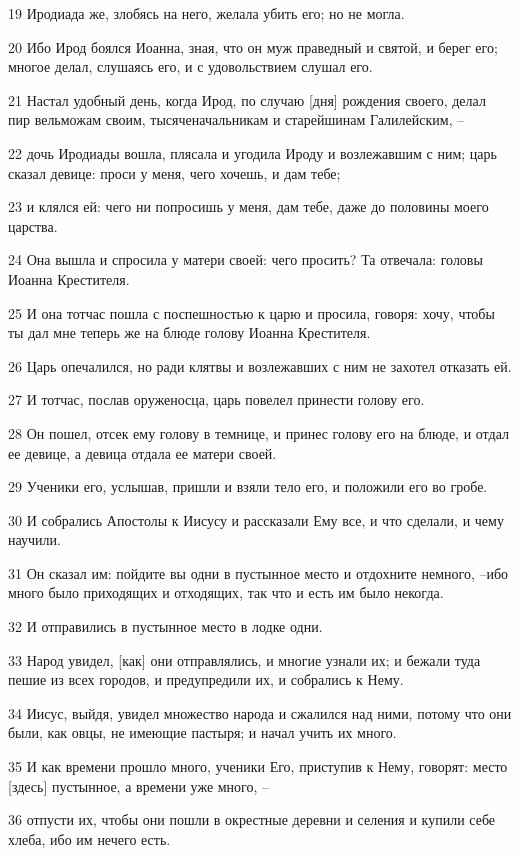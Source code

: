 \par 19 Иродиада же, злобясь на него, желала убить его; но не могла.
\par 20 Ибо Ирод боялся Иоанна, зная, что он муж праведный и святой, и берег его; многое делал, слушаясь его, и с удовольствием слушал его.
\par 21 Настал удобный день, когда Ирод, по случаю [дня] рождения своего, делал пир вельможам своим, тысяченачальникам и старейшинам Галилейским, --
\par 22 дочь Иродиады вошла, плясала и угодила Ироду и возлежавшим с ним; царь сказал девице: проси у меня, чего хочешь, и дам тебе;
\par 23 и клялся ей: чего ни попросишь у меня, дам тебе, даже до половины моего царства.
\par 24 Она вышла и спросила у матери своей: чего просить? Та отвечала: головы Иоанна Крестителя.
\par 25 И она тотчас пошла с поспешностью к царю и просила, говоря: хочу, чтобы ты дал мне теперь же на блюде голову Иоанна Крестителя.
\par 26 Царь опечалился, но ради клятвы и возлежавших с ним не захотел отказать ей.
\par 27 И тотчас, послав оруженосца, царь повелел принести голову его.
\par 28 Он пошел, отсек ему голову в темнице, и принес голову его на блюде, и отдал ее девице, а девица отдала ее матери своей.
\par 29 Ученики его, услышав, пришли и взяли тело его, и положили его во гробе.
\par 30 И собрались Апостолы к Иисусу и рассказали Ему все, и что сделали, и чему научили.
\par 31 Он сказал им: пойдите вы одни в пустынное место и отдохните немного, --ибо много было приходящих и отходящих, так что и есть им было некогда.
\par 32 И отправились в пустынное место в лодке одни.
\par 33 Народ увидел, [как] они отправлялись, и многие узнали их; и бежали туда пешие из всех городов, и предупредили их, и собрались к Нему.
\par 34 Иисус, выйдя, увидел множество народа и сжалился над ними, потому что они были, как овцы, не имеющие пастыря; и начал учить их много.
\par 35 И как времени прошло много, ученики Его, приступив к Нему, говорят: место [здесь] пустынное, а времени уже много, --
\par 36 отпусти их, чтобы они пошли в окрестные деревни и селения и купили себе хлеба, ибо им нечего есть.
